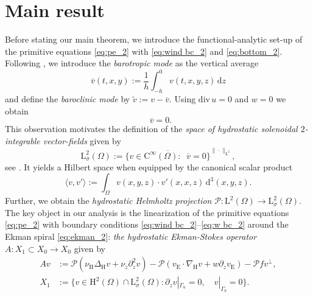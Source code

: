 \documentclass[preprint]{elsarticle}
\numberwithin{equation}{section}
\renewcommand{\d}{\, \mathrm{d}}
\DeclareMathOperator{\divH}{div_{\H}}
\renewcommand{\H}{\mathrm{H}}
\newcommand{\sigmabar}{\bar{\sigma}}
\newcommand{\dk}[1]{\partial_{#1}}
\newcommand{\dz}{\dk{z}}
\renewcommand{\bar}[1]{\overline{#1}}
\newcommand{\vbar}{\bar{v}}
\newcommand{\vtilde}{\tilde{v}}
\newcommand{\nablaH}{\nabla_{\H}}
\newcommand{\DeltaH}{\Delta_{\H}}
\newcommand{\rC}{\mathrm{C}}
\newcommand{\rL}{\mathrm{L}}
\newcommand{\rH}{\H}
\newcommand{\rE}{\mathrm{E}}
\renewcommand{\P}{\mathcal{P}}
\renewcommand{\div}{\mathrm{div} \,}
\begin{document}

\section{Main result}
\label{sec:main_2}

Before stating our main theorem, we introduce the functional-analytic set-up of the primitive equations \eqref{eq:pe_2} with \eqref{eq:wind bc_2} and \eqref{eq:bottom_2}.
Following \cite{CT:07_2}, 
we introduce the \emph{barotropic mode} as the vertical average
\begin{equation*}
	\vbar(t,x,y) := \frac{1}{h} \int_{-h}^{0} v(t,x,y,z) \d z 
\end{equation*}
and define the \emph{baroclinic mode} by $\vtilde := v - \vbar$.
Using $\div u = 0$ and $w = 0$ we obtain
\begin{equation*}
	\divH \vbar = 0  .
\end{equation*}
This observation motivates the definition of the \emph{space of hydrostatic solenoidal $2$-integrable vector-fields} given by 
\begin{equation*}
	\rL^2_{\sigmabar}(\Omega)
	:= \overline{\{ v \in \rC^\infty(\Omega) \colon \divH \vbar = 0 \}}^{\| \cdot \|_{\rL^2}},
\end{equation*}
see \cite{HK:16_2}. 
It yields a Hilbert space when equipped by the canonical scalar product
\begin{equation*}
	\langle v, v' \rangle 
	:= \int_{\Omega} v(x,y,z) \cdot v'(x,x,z) \, \mathrm{d}^3(x,y,z) .
\end{equation*}
Further, we obtain the \emph{hydrostatic Helmholtz projection} $\P \colon \rL^2(\Omega) \to \rL^2_{\sigmabar}(\Omega)$. %
\enlargethispage{\baselineskip}
The key object in our analysis is the linearization of the primitive equations \eqref{eq:pe_2} with boundary conditions \eqref{eq:wind bc_2}--\eqref{eq:w bc_2} around the Ekman spiral \eqref{eq:ekman_2}: 
\emph{the hydrostatic Ekman-Stokes operator} 
$A \colon X_1 \subset X_0 \to X_0$ given by
\begin{equation*}
	\begin{aligned} 
		A v &:= \P ( \nu_{\rH} \DeltaH v +\nu_z \partial_z^2 v)
		- \P (v_{\rE} \cdot \nablaH v 
		+ w \dz v_{\rE}) 
		- \P f v^\perp,
		\\
		X_1 &:= \{ v \in \rH^{2}(\Omega) \cap \rL^2_{\sigmabar}(\Omega) \colon \partial_z v|_{\Gamma_u} = 0, \quad v|_{\Gamma_b} = 0 \} .
	\end{aligned} 
\end{equation*}
\end{document}
